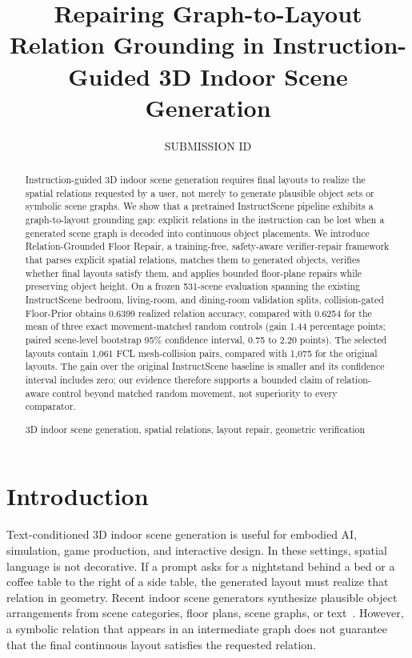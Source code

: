 \documentclass{egpubl}
\title{Repairing Graph-to-Layout Relation Grounding in Instruction-Guided 3D Indoor Scene Generation}
\author[SUBMISSION ID]{SUBMISSION ID}
\newcommand{\method}{Relation-Grounded Floor Repair}
\newcommand{\fp}{Floor-Prior}
\begin{document}
\maketitle

\begin{abstract}
Instruction-guided 3D indoor scene generation requires final layouts to realize the spatial relations requested by a user, not merely to generate plausible object sets or symbolic scene graphs. We show that a pretrained InstructScene pipeline exhibits a graph-to-layout grounding gap: explicit relations in the instruction can be lost when a generated scene graph is decoded into continuous object placements. We introduce \method, a training-free, safety-aware verifier-repair framework that parses explicit spatial relations, matches them to generated objects, verifies whether final layouts satisfy them, and applies bounded floor-plane repairs while preserving object height. On a frozen 531-scene evaluation spanning the existing InstructScene bedroom, living-room, and dining-room validation splits, collision-gated \fp{} obtains 0.6399 realized relation accuracy, compared with 0.6254 for the mean of three exact movement-matched random controls (gain 1.44 percentage points; paired scene-level bootstrap 95\% confidence interval, 0.75 to 2.20 points). The selected layouts contain 1,061 FCL mesh-collision pairs, compared with 1,075 for the original layouts. The gain over the original InstructScene baseline is smaller and its confidence interval includes zero; our evidence therefore supports a bounded claim of relation-aware control beyond matched random movement, not superiority to every comparator.
\printccsdesc
\begin{keywords}
3D indoor scene generation, spatial relations, layout repair, geometric verification
\end{keywords}
\end{abstract}

\section{Introduction}

Text-conditioned 3D indoor scene generation is useful for embodied AI, simulation, game production, and interactive design. In these settings, spatial language is not decorative. If a prompt asks for a nightstand behind a bed or a coffee table to the right of a side table, the generated layout must realize that relation in geometry. Recent indoor scene generators synthesize plausible object arrangements from scene categories, floor plans, scene graphs, or text~\cite{paschalidou2021atiss,wang2021sceneformer,tang2024diffuscene,lin2024instructscene}. However, a symbolic relation that appears in an intermediate graph does not guarantee that the final continuous layout satisfies the requested relation.
\end{document}
